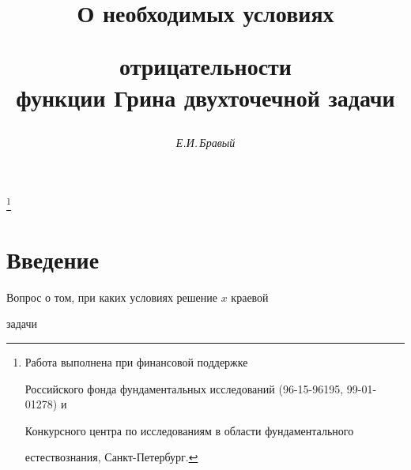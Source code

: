 

\setcounter{page}{12}















\author{\it Е.И.\,Бравый}




\title{О необходимых условиях


отрицательности\\ функции Грина двухточечной задачи}


\thanks{Работа выполнена при финансовой поддержке


Российского фонда фундаментальных исследований (96-15-96195, 99-01-01278) и


Конкурсного центра по исследованиям в области фундаментального


естествознания, Санкт-Петербург.}





\date{}




\pagestyle{plain} %







\maketitle


\label{begin}





\section{Введение}





Вопрос о том, при каких условиях решение $x$ краевой


задачи


